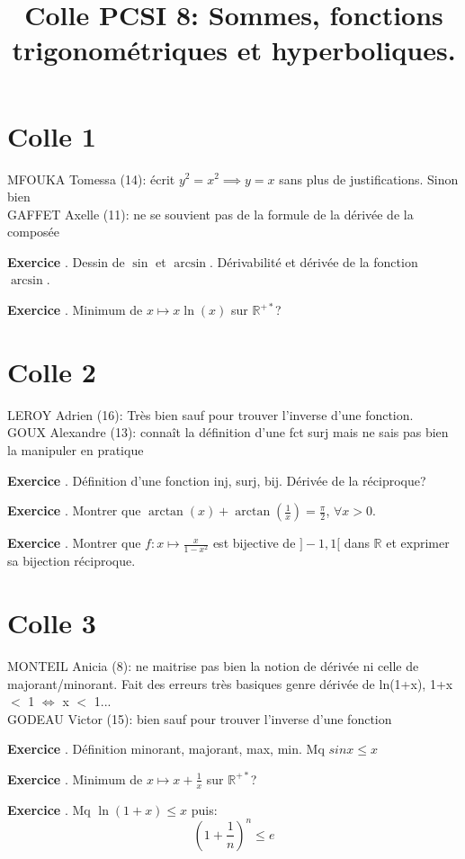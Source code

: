 \documentclass[10pt,a4paper]{article}
\title{Colle PCSI 8: Sommes, fonctions trigonométriques et hyperboliques.}
\newcounter{question}
\newcounter{exo}
\newenvironment{exo}{\vspace{0.5cm}\setcounter{question}{0}\addtocounter{exo}{1} \noindent \textbf{Exercice \theexo}. \normalsize }{\par}
\begin{document}
	\maketitle
	
	
	\section*{Colle 1}
	\setcounter{exo}{0}
	MFOUKA Tomessa (14): écrit $y^2 = x^2 \implies y = x$ sans plus de justifications. Sinon bien\\
	GAFFET Axelle (11): ne se souvient pas de la formule de la dérivée de la composée\\
	
	\begin{exo}
		Dessin de $\sin$ et $\arcsin$. Dérivabilité et dérivée de la fonction $\arcsin$. 
	\end{exo}

	\begin{exo}
		Minimum de $x \longmapsto x \ln(x)$ sur $\mathbb{R}^{+*}$?
	\end{exo}

	\section*{Colle 2}
	\setcounter{exo}{0}
	LEROY Adrien (16): Très bien sauf pour trouver l'inverse d'une fonction.\\
	GOUX Alexandre (13): connaît la définition d'une fct surj mais ne sais pas bien la manipuler en pratique\\
	
	\begin{exo}
	    Définition d'une fonction inj, surj, bij. Dérivée de la réciproque?
	\end{exo}
		
	\begin{exo}
		Montrer que $\arctan(x) + \arctan(\frac{1}{x}) = \frac{\pi}{2}$, $\forall x > 0$.
	\end{exo}
	
	\begin{exo}
		Montrer que $f: x \longmapsto \frac{x}{1-x^2}$ est bijective de $]-1, 1[$ dans $\mathbb{R}$ et exprimer sa bijection réciproque.
	\end{exo}	
			
	\section*{Colle 3}
	\setcounter{exo}{0}
	MONTEIL Anicia (8): ne maitrise pas bien la notion de dérivée ni celle de majorant/minorant. Fait des erreurs très basiques genre dérivée de ln(1+x), 1+x $<$ 1 $\Leftrightarrow$ x $<$ 1...\\
	GODEAU Victor (15): bien sauf pour trouver l'inverse d'une fonction\\
	
	\begin{exo}
		Définition minorant, majorant, max, min. Mq $sin x \leq x$ 
	\end{exo}

	\begin{exo}
		Minimum de $x \longmapsto x + \frac{1}{x}$ sur $\mathbb{R}^{+*}$?
	\end{exo}

	\begin{exo}
		Mq $\ln(1+x) \leq x$ puis: $$(1 + \frac{1}{n})^n \leq e$$
	\end{exo}
	
\end{document}
